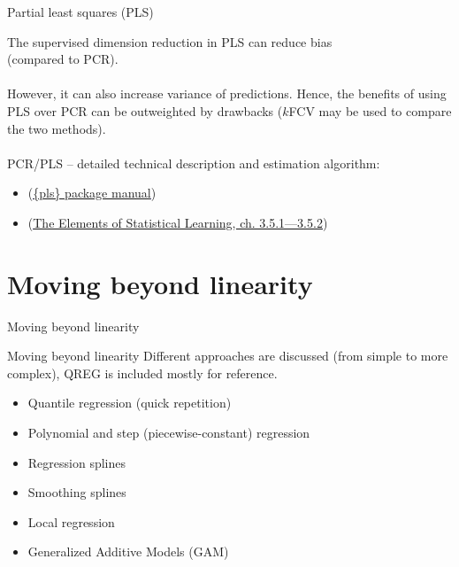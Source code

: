 \documentclass{beamer}
\begin{document}
\begin{frame}{Partial least squares (PLS)}

The supervised dimension reduction in PLS can reduce bias \\(compared to PCR). \\~\\However, it can also increase variance of predictions. Hence, the benefits of using PLS over PCR can be outweighted by drawbacks ($k$FCV may be used to compare the two methods).\\~\\

PCR/PLS -- detailed technical description and estimation algorithm:
\begin{itemize}
\item (\textcolor{blue}{\underline{\href{https://cran.r-project.org/web/packages/pls/vignettes/pls-manual.pdf}{\{pls\} package manual}}})
\item (\textcolor{blue}{\underline{\href{https://web.stanford.edu/~hastie/ElemStatLearn/}{The Elements of 
Statistical Learning, ch. 3.5.1---3.5.2}}})
\end{itemize}
\end{frame}
\section{Moving beyond linearity}
\begin{frame}{Moving beyond linearity}
\end{frame}
\begin{frame}{Moving beyond linearity}
Different approaches are discussed (from simple to more complex), QREG is included mostly for reference.\\
\bigskip

\begin{itemize}
\item Quantile regression (quick repetition)
\smallskip
\item Polynomial and step (piecewise-constant) regression
\smallskip
\item Regression splines
\smallskip
\item Smoothing splines
\smallskip
\item Local regression
\smallskip
\item Generalized Additive Models (GAM)
\end{itemize}
\end{frame}
\end{document}
